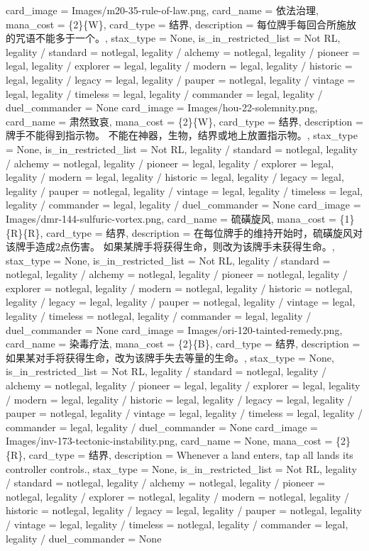 \documentclass[lang = cn, color = black, 10pt]{AllThatStax}
\begin{document}
\card
{
	card_image = Images/m20-35-rule-of-law.png,
	card_name = 依法治理,
	mana_cost = \{2\}\{W\},
	card_type = 结界,
	description = 每位牌手每回合所施放的咒语不能多于一个。,
	stax_type = None,
	is_in_restricted_list = Not RL,
	legality / standard = notlegal,
	legality / alchemy = notlegal,
	legality / pioneer = legal,
	legality / explorer = legal,
	legality / modern = legal,
	legality / historic = legal,
	legality / legacy = legal,
	legality / pauper = notlegal,
	legality / vintage = legal,
	legality / timeless = legal,
	legality / commander = legal,
	legality / duel_commander = None
}
\card
{
	card_image = Images/hou-22-solemnity.png,
	card_name = 肃然致哀,
	mana_cost = \{2\}\{W\},
	card_type = 结界,
	description = 牌手不能得到指示物。
	不能在神器，生物，结界或地上放置指示物。,
	stax_type = None,
	is_in_restricted_list = Not RL,
	legality / standard = notlegal,
	legality / alchemy = notlegal,
	legality / pioneer = legal,
	legality / explorer = legal,
	legality / modern = legal,
	legality / historic = legal,
	legality / legacy = legal,
	legality / pauper = notlegal,
	legality / vintage = legal,
	legality / timeless = legal,
	legality / commander = legal,
	legality / duel_commander = None
}
\card
{
	card_image = Images/dmr-144-sulfuric-vortex.png,
	card_name = 硫磺旋风,
	mana_cost = \{1\}\{R\}\{R\},
	card_type = 结界,
	description = 在每位牌手的维持开始时，硫磺旋风对该牌手造成2点伤害。
	如果某牌手将获得生命，则改为该牌手未获得生命。,
	stax_type = None,
	is_in_restricted_list = Not RL,
	legality / standard = notlegal,
	legality / alchemy = notlegal,
	legality / pioneer = notlegal,
	legality / explorer = notlegal,
	legality / modern = notlegal,
	legality / historic = notlegal,
	legality / legacy = legal,
	legality / pauper = notlegal,
	legality / vintage = legal,
	legality / timeless = notlegal,
	legality / commander = legal,
	legality / duel_commander = None
}
\card
{
	card_image = Images/ori-120-tainted-remedy.png,
	card_name = 染毒疗法,
	mana_cost = \{2\}\{B\},
	card_type = 结界,
	description = 如果某对手将获得生命，改为该牌手失去等量的生命。,
	stax_type = None,
	is_in_restricted_list = Not RL,
	legality / standard = notlegal,
	legality / alchemy = notlegal,
	legality / pioneer = legal,
	legality / explorer = legal,
	legality / modern = legal,
	legality / historic = legal,
	legality / legacy = legal,
	legality / pauper = notlegal,
	legality / vintage = legal,
	legality / timeless = legal,
	legality / commander = legal,
	legality / duel_commander = None
}
\card
{
	card_image = Images/inv-173-tectonic-instability.png,
	card_name = None,
	mana_cost = \{2\}\{R\},
	card_type = 结界,
	description = Whenever a land enters, tap all lands its controller controls.,
	stax_type = None,
	is_in_restricted_list = Not RL,
	legality / standard = notlegal,
	legality / alchemy = notlegal,
	legality / pioneer = notlegal,
	legality / explorer = notlegal,
	legality / modern = notlegal,
	legality / historic = notlegal,
	legality / legacy = legal,
	legality / pauper = notlegal,
	legality / vintage = legal,
	legality / timeless = notlegal,
	legality / commander = legal,
	legality / duel_commander = None
}
\end{document}
